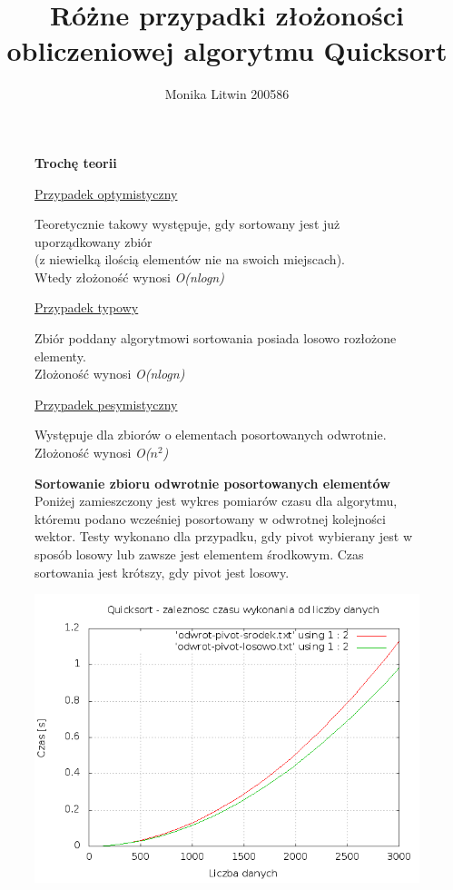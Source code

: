 \documentclass[a4paper,11pt]{report}
\title{Różne przypadki złożoności obliczeniowej algorytmu Quicksort}
\author{Monika Litwin 200586}
\begin{document}
\maketitle

\begin{figure}
  \begin{center}
  \textbf{Trochę teorii}
\\
\begin{flushleft}\underline{Przypadek optymistyczny}\end{flushleft}
Teoretycznie takowy występuje, gdy sortowany jest już uporządkowany zbiór \\(z niewielką ilością elementów nie na swoich miejscach). \\Wtedy złożoność wynosi \emph{O(nlogn)}

\begin{flushleft}\underline{Przypadek typowy}\end{flushleft}
Zbiór poddany algorytmowi sortowania posiada losowo rozłożone elementy.\\ Złożoność wynosi \emph{O(nlogn)}

\begin{flushleft}\underline{Przypadek pesymistyczny}\end{flushleft}
Występuje dla zbiorów o elementach posortowanych odwrotnie.\\ Złożoność wynosi \emph{O($ n^{2}$)}

    \label{fig:}
  \end{center}
\end{figure}

\begin{figure}
  \begin{center}
	\textbf{Sortowanie zbioru odwrotnie posortowanych elementów}
\\ Poniżej zamieszczony jest wykres pomiarów czasu dla algorytmu, któremu podano wcześniej posortowany w odwrotnej kolejności wektor. Testy wykonano dla przypadku, gdy pivot wybierany jest w sposób losowy lub zawsze jest elementem środkowym.
Czas sortowania jest krótszy, gdy pivot jest losowy.

    \includegraphics[scale=0.5]{./odwrotnie.png}
    \label{fig:}
  \end{center}
\end{figure}
\end{document}
